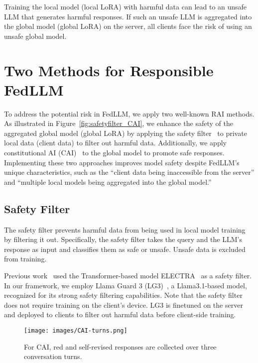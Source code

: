 Training the local model (local LoRA) with harmful data can lead to an unsafe LLM that generates harmful responses.  
If such an unsafe LLM is aggregated into the global model (global LoRA) on the server, all clients face the risk of using an unsafe global model.



\section{Two Methods for Responsible FedLLM}
To address the potential risk in FedLLM, we apply two well-known RAI methods. 
As illustrated in Figure~\ref{fig:safetyfilter_CAI}, we enhance the safety of the aggregated global model (global LoRA) by applying the safety filter~\cite{llamaguard} to private local data (client data) to filter out harmful data.
Additionally, we apply constitutional AI (CAI)~\cite{CAI} to the global model to promote safe responses.
Implementing these two approaches improves model safety despite FedLLM’s unique characteristics, such as the ``client data being inaccessible from the server'' and ``multiple local models being aggregated into the global model.''



\subsection{Safety Filter}\label{subsec:safety}
The safety filter prevents harmful data from being used in local model training by filtering it out.
Specifically, the safety filter takes the query and the LLM's response as input and classifies them as safe or unsafe.  
Unsafe data is excluded from training.

Previous work~\cite{square} used the Transformer\cite{Transformer}-based model ELECTRA~\cite{electra} as a safety filter.
In our framework, we employ Llama Guard 3 (LG3)~\cite{llamaguard}, a Llama3.1\cite{llama3.1}-based model, recognized for its strong safety filtering capabilities.
Note that the safety filter does not require training on the client's device.  
LG3 is finetuned on the server and deployed to clients to filter out harmful data before client-side training.


\begin{figure*}[t]
    \centering
    \texttt{[image: images/CAI-turns.png]} 
    \caption{For CAI, red and self-revised responses are collected over three conversation turns.
}
    \label{fig:CAI-turns}
\end{figure*}


